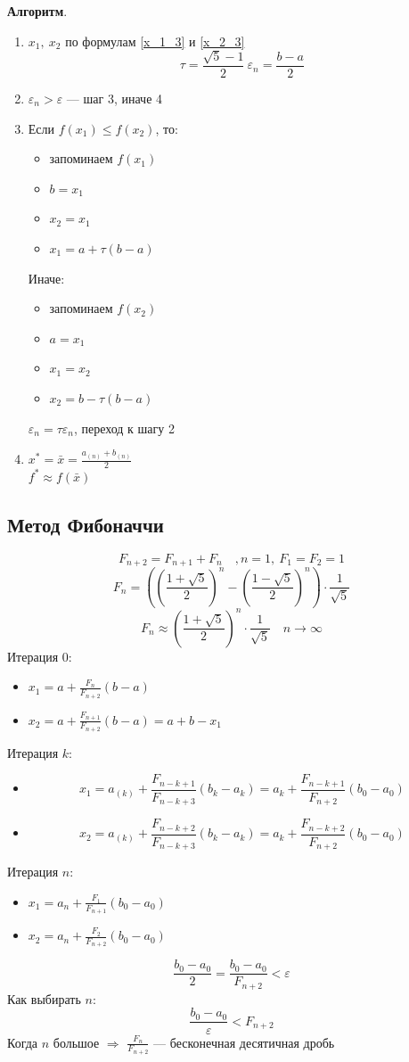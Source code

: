 \documentclass[oneside]{book}
\theoremstyle{plain}
\theoremstyle{remark}
\theoremstyle{definition}
\begin{document}
\textbf{Алгоритм}.
\begin{enumerate}
\item \(x_1,\ x_2\) по формулам \ref{x_1_3} и \ref{x_2_3}
\[ \tau = \frac{\sqrt{5} - 1}{2}\ \varepsilon_n = \frac{b - a}{2} \]
\item \(\varepsilon_n > \varepsilon\) --- шаг 3, иначе 4
\item Если \(f(x_1) \le f(x_2)\), то:
\begin{itemize}
\item запоминаем \(f(x_1)\)
\item \(b = x_1\)
\item \(x_2 = x_1\)
\item \(x_1 = a + \tau(b - a)\)
\end{itemize}
Иначе:
\begin{itemize}
\item запоминаем \(f(x_2)\)
\item \(a = x_1\)
\item \(x_1 = x_2\)
\item \(x_2 = b - \tau(b - a)\)
\end{itemize}
\(\varepsilon_n = \tau\varepsilon_n\), переход к шагу 2
\item \(x^* = \bar{x} = \frac{a_{(n)} + b_{(n)}}{2}\) \\
\(f^* \approx f(\bar{x})\)
\end{enumerate}
\subsection{Метод Фибоначчи}
\label{sec:orge1196f2}
\[ F_{n + 2} = F_{n + 1} + F_n\quad, n = 1,\ F_1 = F_2 = 1 \]
\[ F_n = \left(\left(\frac{1 + \sqrt{5}}{2}\right)^n - \left(\frac{1 - \sqrt{5}}{2}\right)^n\right)\cdot\frac{1}{\sqrt{5}} \]
\[ F_n \approx \left(\frac{1 + \sqrt{5}}{2}\right)^n \cdot \frac{1}{\sqrt{5}} \quad n \to \infty \]
Итерация 0:
\begin{itemize}
\item \(x_1 = a + \frac{F_n}{F_{n + 2}} (b - a)\)
\item \(x_2 = a + \frac{F_{n + 1}}{F_{n + 2}}(b - a) = a + b - x_1\)
\end{itemize}
Итерация \(k\):
\begin{itemize}
\item \[ x_1 = a_{(k)} + \frac{F_{n - k + 1}}{F_{n - k + 3}}(b_k - a_k) = a_k + \frac{F_{n -k + 1}}{F_{n + 2}}(b_0 - a_0) \]
\item \[ x_2 = a_{(k)} + \frac{F_{n - k + 2}}{F_{n - k + 3}}(b_k - a_k) = a_k + \frac{F_{n -k + 2}}{F_{n + 2}}(b_0 - a_0) \]
\end{itemize}
Итерация \(n\):
\begin{itemize}
\item \(x_1 = a_n + \frac{F_1}{F_{n + 1}}(b_0 - a_0)\)
\item \(x_2 = a_n + \frac{F_2}{F_{n + 2}}(b_0 - a_0)\)
\end{itemize}
\[ \frac{b_0 - a_0}{2} = \frac{b_0 - a_0}{F_{n + 2}} < \varepsilon \]
Как выбирать \(n\):
\[ \frac{b_0 - a_0}{\varepsilon} < F_{n + 2} \]
Когда \(n\) большое \(\Rightarrow\) \(\frac{F_n}{F_{n + 2}}\) --- бесконечная десятичная дробь
\end{document}
